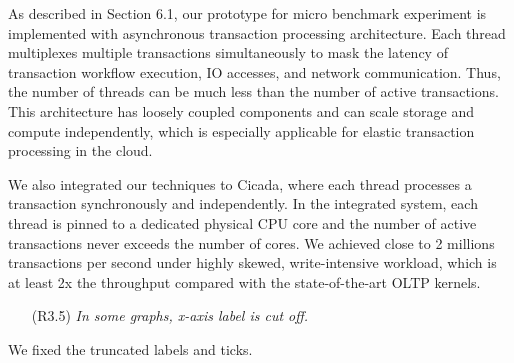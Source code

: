 \documentclass{article}
\newcommand{\changed}[1]{#1}
\newcommand{\changed}[1]{{\color{blue}#1}}
\begin{document}
\changed{
	As described in Section 6.1, our prototype for micro benchmark experiment is implemented with asynchronous transaction processing architecture. Each thread multiplexes multiple transactions simultaneously to mask the latency of transaction workflow execution, IO accesses, and network communication. Thus, the number of threads can be much less than the number of active transactions. This architecture has loosely coupled components and can scale storage and compute independently, which is especially applicable for elastic transaction processing in the cloud.

	We also integrated our techniques to Cicada, where each thread processes a transaction synchronously and independently. In the integrated system, each thread is pinned to a dedicated physical CPU core and the number of active transactions never exceeds the number of cores. We achieved close to 2 millions transactions per second under highly skewed, write-intensive workload, which is at least 2x the throughput compared with the state-of-the-art OLTP kernels.  
}

\begin{itemize}
\item[(R3.5)] \emph{In some graphs, x-axis label is cut off.}
\end{itemize}

\changed{
	We fixed the truncated labels and ticks.
}
\end{document}
